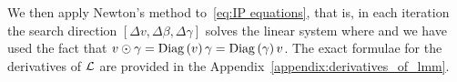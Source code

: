 We then apply Newton's method to~\eqref{eq:IP equations}, 
that is, in each iteration the search direction $[\Delta v, \Delta \beta, \Delta \gamma]$ solves the linear system
where 
and we have used the fact that  $v\odot \gamma=\mathrm{Diag}\left(v\right)\gamma=\mathrm{Diag}\left(\gamma\right)v$. 
The exact formulae for the derivatives of $\operatorname{\mathcal{L}}$ are provided in the Appendix~\ref{appendix:derivatives_of_lmm}.

